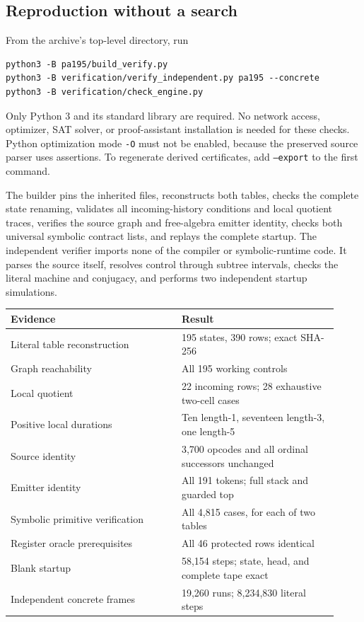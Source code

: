 \documentclass[11pt,letterpaper]{article}
\newcommand{\code}[1]{\texttt{#1}}
\begin{document}
\subsection{Reproduction without a search}
From the archive's top-level directory, run
\begin{verbatim}
python3 -B pa195/build_verify.py
python3 -B verification/verify_independent.py pa195 --concrete
python3 -B verification/check_engine.py
\end{verbatim}
Only Python 3 and its standard library are required. No network access,
optimizer, SAT solver, or proof-assistant installation is needed for
these checks. Python optimization mode \code{-O} must not be enabled,
because the preserved source parser uses assertions. To regenerate
derived certificates, add \code{--export} to the first command.

The builder pins the inherited files, reconstructs both tables, checks
the complete state renaming, validates all incoming-history conditions
and local quotient traces, verifies the source graph and free-algebra
emitter identity, checks both universal symbolic contract lists, and
replays the complete startup. The independent verifier imports none of
the compiler or symbolic-runtime code. It parses the source itself,
resolves control through subtree intervals, checks the literal machine
and conjugacy, and performs two independent startup simulations.

\begin{center}\small
\begin{tabular}{@{}p{0.48\linewidth}p{0.44\linewidth}@{}}
\toprule
Evidence & Result\\
\midrule
Literal table reconstruction & 195 states, 390 rows; exact SHA-256\\
Graph reachability & All 195 working controls\\
Local quotient & 22 incoming rows; 28 exhaustive two-cell cases\\
Positive local durations & Ten length-1, seventeen length-3, one length-5\\
Source identity & 3,700 opcodes and all ordinal successors unchanged\\
Emitter identity & All 191 tokens; full stack and guarded top\\
Symbolic primitive verification & All 4,815 cases, for each of two tables\\
Register oracle prerequisites & All 46 protected rows identical\\
Blank startup & 58,154 steps; state, head, and complete tape exact\\
Independent concrete frames & 19,260 runs; 8,234,830 literal steps\\
\bottomrule
\end{tabular}
\end{center}
\end{document}
